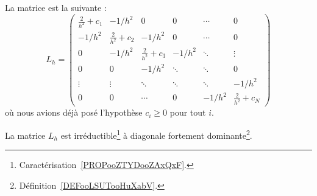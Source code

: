 La matrice est la suivante :
\begin{equation}
	L_h=\begin{pmatrix}
		\frac{ 2 }{ h^2 }+c_1 & -1/h^2                & 0                     & 0      & \cdots & 0                     \\
		-1/h^2                & \frac{ 2 }{ h^2 }+c_2 & -1/h^2                & 0      & \cdots & 0                     \\
		0                     & -1/h^2                & \frac{ 2 }{ h^2 }+c_3 & -1/h^2 & \ddots & \vdots                \\
		0                     & 0                     & -1/h^2                & \ddots & \ddots & 0                     \\
		\vdots                & \vdots                & \ddots                & \ddots & \ddots & -1/h^2                \\
		0                     & 0                     & \cdots                & 0      & -1/h^2 & \frac{ 2 }{ h^2 }+c_N
	\end{pmatrix}
\end{equation}
où nous avions déjà posé l'hypothèse \( c_i\geq 0\) pour tout \( i\).

\begin{lemma}       \label{LEMooGGHQooNnVsuu}
	La matrice \( L_h\) est irréductible\footnote{Caractérisation~\ref{PROPooZTYDooZAxQxF}.} à diagonale fortement dominante\footnote{Définition~\ref{DEFooLSUTooHuXabV}.}.
\end{lemma}

